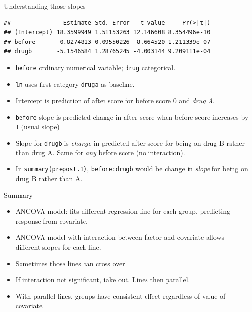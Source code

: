\begin{frame}[fragile]{Understanding those slopes}
  
  \begin{scriptsize}
\begin{knitrout}
\color{fgcolor}\begin{kframe}
\begin{alltt}
\hlopt{$}
\end{alltt}
\begin{verbatim}
##               Estimate Std. Error   t value     Pr(>|t|)
## (Intercept) 18.3599949 1.51153263 12.146608 8.354496e-10
## before       0.8274813 0.09550226  8.664520 1.211339e-07
## drugb       -5.1546584 1.28765245 -4.003144 9.209111e-04
\end{verbatim}
\end{kframe}
\end{knitrout}
  \end{scriptsize}

\begin{itemize}
\item \texttt{before} ordinary numerical variable; \texttt{drug}
  categorical. 
\item \texttt{lm} uses first category \texttt{druga} as baseline.
\item Intercept is prediction of after score for before score 0 and
  \emph{drug A}.
\item \texttt{before} slope is predicted change in after score when
  before score increases by 1 (usual slope)
\item Slope for \texttt{drugb} is \emph{change} in predicted after
  score for being on drug B rather than drug A. Same for \emph{any}
  before score (no interaction).
\item In \texttt{summary(prepost.1)}, \texttt{before:drugb} would be change in
  \emph{slope} for being on drug B rather than A.
  
\end{itemize}

  
\end{frame}

\begin{frame}[fragile]{Summary}

  \begin{itemize}
  \item ANCOVA model: fits different regression line for each group,
    predicting response from covariate.
  \item ANCOVA model with interaction between factor and covariate
    allows different slopes for each line.
  \item Sometimes those lines can cross over!
  \item If interaction not significant, take out. Lines then parallel.
  \item With parallel lines, groups have consistent effect regardless
    of value of covariate.
  \end{itemize}
  
\end{frame}
